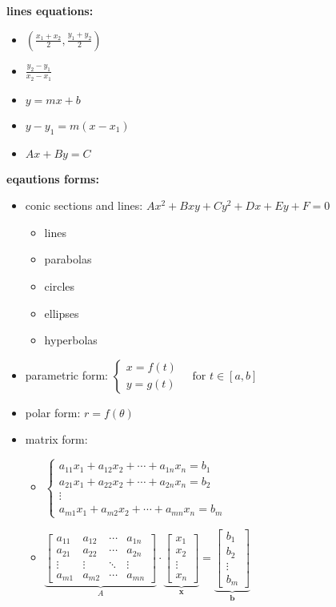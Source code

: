 \documentclass{article}
\begin{document}
\textbf{lines equations:}\\
	\begin{itemize}
		\item $(\frac{x_1 + x_2}{2}, \frac{y_1 + y_2}{2})$
		\item $\frac{y_2 - y_1}{x_2 - x_1}$
		\item $y = mx + b$
		\item $y - y_1 = m(x - x_1)$
		\item $Ax + By = C$ 
	\end{itemize}

\textbf{eqautions forms:}
	\begin{itemize}
		\item conic sections and lines: $Ax^2 + Bxy + Cy^2 + Dx + Ey + F = 0$
			\begin{itemize}
				\item lines
				\item parabolas
				\item circles
				\item ellipses
				\item hyperbolas
			\end{itemize}
		\item parametric form: $\begin{cases} x = f(t) \\ y = g(t) \end{cases} \quad \text{for } t \in [a, b]$ 
		\item polar form: $r = f(\theta)$
		\item matrix form:

			\begin{itemize}
				\item $\begin{cases} a_{11} x_1 + a_{12} x_2 + \cdots + a_{1n} x_n = b_1 \\ a_{21} x_1 + a_{22} x_2 + \cdots + a_{2n} x_n = b_2 \\ \vdots \\ a_{m1} x_1 + a_{m2} x_2 + \cdots + a_{mn} x_n = b_m \end{cases}$ 
				\item $ \underbrace{\begin{bmatrix} a_{11} & a_{12} & \cdots & a_{1n} \\ a_{21} & a_{22} & \cdots & a_{2n} \\ \vdots & \vdots & \ddots & \vdots \\ a_{m1} & a_{m2} & \cdots & a_{mn}\end{bmatrix} }_{A} \cdot \underbrace{ \begin{bmatrix} x_1 \\ x_2 \\ \vdots \\ x_n \end{bmatrix} }_{\mathbf{x}} = \underbrace{ \begin{bmatrix} b_1 \\ b_2 \\ \vdots \\ b_m \end{bmatrix} }_{\mathbf{b}}$
			\end{itemize}
	\end{itemize}
\end{document}
